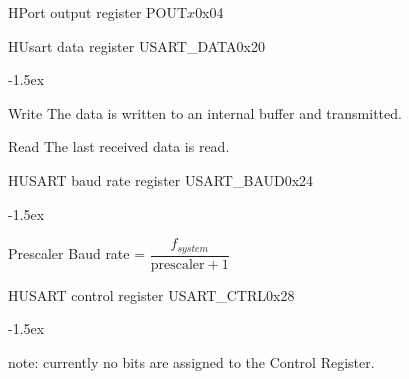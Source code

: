 \documentclass[12pt]{article}
\begin{document}
\begin{register}{H}{Port output register POUT$x$}{0x04}%
\label{poutx}%
\regnewline%
\end{register}

\begin{register}{H}{Usart data register USART\_DATA}{0x20}
\label{usartdata}
%
%
\regnewline%
\end{register}
\begin{regdesc}[0.6\textwidth]\begin{reglist}[000000000]
\itemsep-1.5ex
\item[Write] The data is written to an internal buffer and transmitted.
\item[Read] The last received data is read.
\end{reglist}\end{regdesc}

\begin{register}{H}{USART baud rate register USART\_BAUD}{0x24}
\label{usartbaud}
%
%
\regnewline%
\end{register}
\begin{regdesc}[0.6\textwidth]\begin{reglist}[000000000]
\itemsep-1.5ex
\item[Prescaler] Baud rate = $\dfrac{f_{system}}{\textrm{prescaler}+1}$
\end{reglist}\end{regdesc}

\begin{register}{H}{USART control register USART\_CTRL}{0x28}
\label{usartctrl}
%
\regnewline%
\end{register}
\begin{regdesc}[0.6\textwidth]\begin{reglist}[00000]
\itemsep-1.5ex
\item [note:] currently no bits are assigned to the Control Register.
\end{reglist}\end{regdesc}
\end{document}
